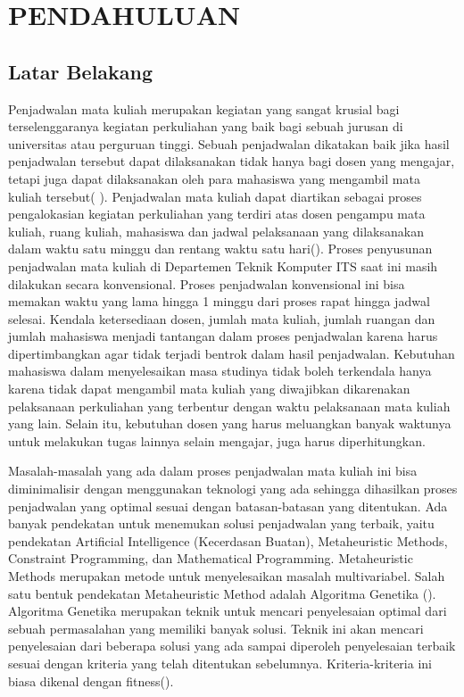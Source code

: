 \chapter{PENDAHULUAN}
\label{chap:pendahuluan}



\section{Latar Belakang}
\label{sec:latarbelakang}

Penjadwalan mata kuliah merupakan kegiatan yang sangat krusial bagi terselenggaranya kegiatan perkuliahan yang baik bagi sebuah jurusan di universitas atau perguruan tinggi. 
Sebuah penjadwalan dikatakan baik jika hasil penjadwalan tersebut dapat dilaksanakan tidak hanya bagi dosen yang mengajar, tetapi juga dapat dilaksanakan oleh para mahasiswa yang mengambil mata kuliah tersebut(  \cite{ramadhani2021perancangan}).
Penjadwalan mata kuliah dapat diartikan sebagai proses pengalokasian kegiatan perkuliahan yang terdiri atas dosen pengampu mata kuliah, ruang kuliah, mahasiswa dan jadwal pelaksanaan yang dilaksanakan dalam waktu satu minggu dan rentang waktu satu hari(\cite{Mone2021}).
Proses penyusunan penjadwalan mata kuliah di Departemen Teknik Komputer ITS saat ini masih dilakukan secara konvensional. Proses penjadwalan konvensional ini bisa memakan waktu yang lama hingga 1 minggu dari proses rapat hingga jadwal selesai. 
Kendala ketersediaan dosen, jumlah mata kuliah, jumlah ruangan dan jumlah mahasiswa menjadi tantangan dalam proses penjadwalan karena harus dipertimbangkan agar tidak terjadi bentrok dalam hasil penjadwalan. 
Kebutuhan mahasiswa dalam menyelesaikan masa studinya tidak boleh terkendala hanya karena tidak dapat mengambil mata kuliah yang diwajibkan dikarenakan pelaksanaan perkuliahan yang terbentur dengan waktu pelaksanaan mata kuliah yang lain. 
Selain itu, kebutuhan dosen yang harus meluangkan banyak waktunya untuk melakukan tugas lainnya selain mengajar, juga harus diperhitungkan.

Masalah-masalah yang ada dalam proses penjadwalan mata kuliah ini bisa diminimalisir dengan menggunakan teknologi yang ada sehingga dihasilkan proses penjadwalan yang optimal sesuai dengan batasan-batasan yang ditentukan. 
Ada banyak pendekatan untuk menemukan solusi penjadwalan yang terbaik, yaitu pendekatan Artificial Intelligence (Kecerdasan Buatan), Metaheuristic Methods, Constraint Programming, dan Mathematical Programming. 
Metaheuristic Methods merupakan metode untuk menyelesaikan masalah multivariabel. Salah satu bentuk pendekatan Metaheuristic Method adalah Algoritma Genetika (\cite{ramadhani2021perancangan}). 	
Algoritma Genetika merupakan teknik untuk mencari penyelesaian optimal dari sebuah permasalahan yang memiliki banyak solusi. Teknik ini akan mencari penyelesaian dari beberapa solusi yang ada sampai diperoleh penyelesaian terbaik sesuai dengan kriteria yang telah ditentukan sebelumnya. 
Kriteria-kriteria ini biasa dikenal dengan fitness(\cite{binusAlgoritmaGenetika}).

